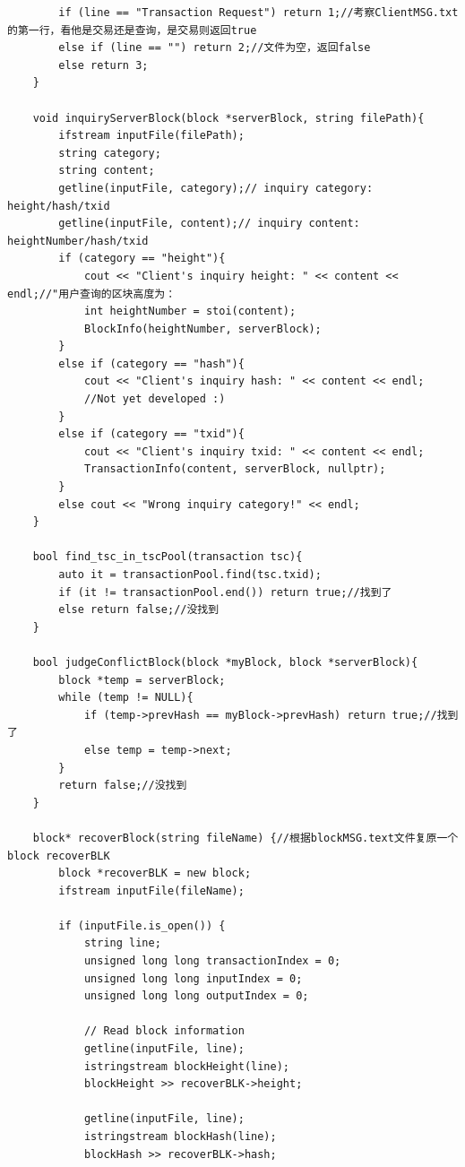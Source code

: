 \documentclass[10pt,a4paper]{article}
\begin{document}
\begin{verbatim}
        if (line == "Transaction Request") return 1;//考察ClientMSG.txt的第一行，看他是交易还是查询，是交易则返回true
        else if (line == "") return 2;//文件为空，返回false
        else return 3;
    }
    
    void inquiryServerBlock(block *serverBlock, string filePath){
        ifstream inputFile(filePath);
        string category;
        string content;
        getline(inputFile, category);// inquiry category: height/hash/txid
        getline(inputFile, content);// inquiry content: heightNumber/hash/txid
        if (category == "height"){
            cout << "Client's inquiry height: " << content << endl;//"用户查询的区块高度为：
            int heightNumber = stoi(content);
            BlockInfo(heightNumber, serverBlock);
        }
        else if (category == "hash"){
            cout << "Client's inquiry hash: " << content << endl;
            //Not yet developed :)
        }
        else if (category == "txid"){
            cout << "Client's inquiry txid: " << content << endl;
            TransactionInfo(content, serverBlock, nullptr);
        }
        else cout << "Wrong inquiry category!" << endl;
    }
    
    bool find_tsc_in_tscPool(transaction tsc){
        auto it = transactionPool.find(tsc.txid);
        if (it != transactionPool.end()) return true;//找到了
        else return false;//没找到
    }
    
    bool judgeConflictBlock(block *myBlock, block *serverBlock){
        block *temp = serverBlock;
        while (temp != NULL){
            if (temp->prevHash == myBlock->prevHash) return true;//找到了
            else temp = temp->next;
        }
        return false;//没找到
    }
    
    block* recoverBlock(string fileName) {//根据blockMSG.text文件复原一个block recoverBLK
        block *recoverBLK = new block;
        ifstream inputFile(fileName);
    
        if (inputFile.is_open()) {
            string line;
            unsigned long long transactionIndex = 0;
            unsigned long long inputIndex = 0;
            unsigned long long outputIndex = 0;
    
            // Read block information
            getline(inputFile, line);
            istringstream blockHeight(line);
            blockHeight >> recoverBLK->height;
    
            getline(inputFile, line);
            istringstream blockHash(line);
            blockHash >> recoverBLK->hash;
    

\end{verbatim}
\end{document}
